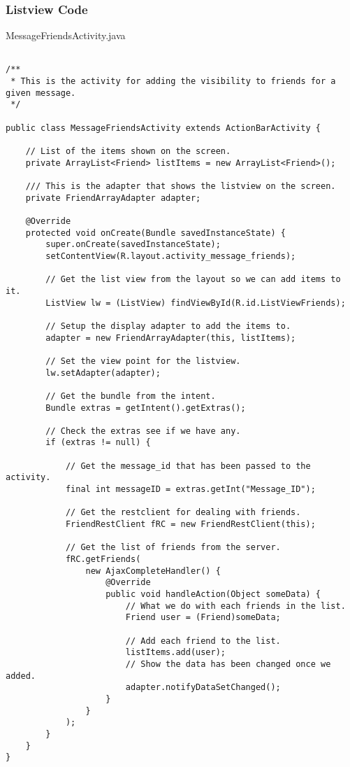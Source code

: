 \subsubsection*{Listview Code}

MessageFriendsActivity.java

\begin{lstlisting}

/**
 * This is the activity for adding the visibility to friends for a given message.
 */

public class MessageFriendsActivity extends ActionBarActivity {

    // List of the items shown on the screen.
    private ArrayList<Friend> listItems = new ArrayList<Friend>();

    /// This is the adapter that shows the listview on the screen.
    private FriendArrayAdapter adapter;

    @Override
    protected void onCreate(Bundle savedInstanceState) {
        super.onCreate(savedInstanceState);
        setContentView(R.layout.activity_message_friends);

        // Get the list view from the layout so we can add items to it.
        ListView lw = (ListView) findViewById(R.id.ListViewFriends);

        // Setup the display adapter to add the items to.
        adapter = new FriendArrayAdapter(this, listItems);

        // Set the view point for the listview.
        lw.setAdapter(adapter);

        // Get the bundle from the intent.
        Bundle extras = getIntent().getExtras();

        // Check the extras see if we have any.
        if (extras != null) {

            // Get the message_id that has been passed to the activity.
            final int messageID = extras.getInt("Message_ID");

            // Get the restclient for dealing with friends.
            FriendRestClient fRC = new FriendRestClient(this);

            // Get the list of friends from the server.
            fRC.getFriends(
                new AjaxCompleteHandler() {
                    @Override
                    public void handleAction(Object someData) {
                        // What we do with each friends in the list.
                        Friend user = (Friend)someData;

                        // Add each friend to the list.
                        listItems.add(user);
                        // Show the data has been changed once we added.
                        adapter.notifyDataSetChanged();
                    }
                }
            );
        }
    }
}
\end{lstlisting}

